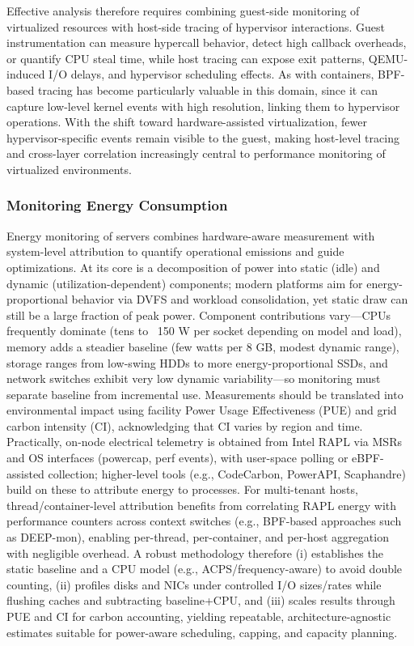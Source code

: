 Effective analysis therefore requires combining guest-side monitoring of virtualized resources with host-side tracing of hypervisor interactions. Guest instrumentation can measure hypercall behavior, detect high callback overheads, or quantify CPU steal time, while host tracing can expose exit patterns, QEMU-induced I/O delays, and hypervisor scheduling effects. As with containers, BPF-based tracing has become particularly valuable in this domain, since it can capture low-level kernel events with high resolution, linking them to hypervisor operations. With the shift toward hardware-assisted virtualization, fewer hypervisor-specific events remain visible to the guest, making host-level tracing and cross-layer correlation increasingly central to performance monitoring of virtualized environments.

\subsubsection{Monitoring Energy Consumption}
\label{sec:background_monitoring_energy}
Energy monitoring of servers combines hardware-aware measurement with system-level attribution to quantify operational emissions and guide optimizations. At its core is a decomposition of power into static (idle) and dynamic (utilization-dependent) components; modern platforms aim for energy-proportional behavior via DVFS and workload consolidation, yet static draw can still be a large fraction of peak power. Component contributions vary—CPUs frequently dominate (tens to ~150 W per socket depending on model and load), memory adds a steadier baseline (few watts per 8 GB, modest dynamic range), storage ranges from low-swing HDDs to more energy-proportional SSDs, and network switches exhibit very low dynamic variability—so monitoring must separate baseline from incremental use. Measurements should be translated into environmental impact using facility Power Usage Effectiveness (PUE) and grid carbon intensity (CI), acknowledging that CI varies by region and time. Practically, on-node electrical telemetry is obtained from Intel RAPL via MSRs and OS interfaces (powercap, perf events), with user-space polling or eBPF-assisted collection; higher-level tools (e.g., CodeCarbon, PowerAPI, Scaphandre) build on these to attribute energy to processes. For multi-tenant hosts, thread/container-level attribution benefits from correlating RAPL energy with performance counters across context switches (e.g., BPF-based approaches such as DEEP-mon), enabling per-thread, per-container, and per-host aggregation with negligible overhead. A robust methodology therefore (i) establishes the static baseline and a CPU model (e.g., ACPS/frequency-aware) to avoid double counting, (ii) profiles disks and NICs under controlled I/O sizes/rates while flushing caches and subtracting baseline+CPU, and (iii) scales results through PUE and CI for carbon accounting, yielding repeatable, architecture-agnostic estimates suitable for power-aware scheduling, capping, and capacity planning.
